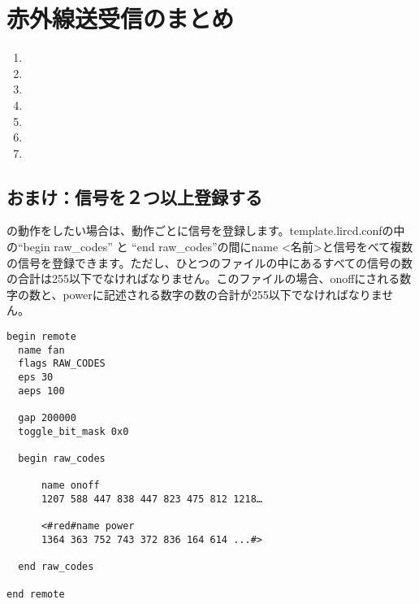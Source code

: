 \newpage
\section{赤外線送受信のまとめ}
\begin{enumerate}
\item {}
\item {}
\item {}
\item {}
\item {}
\item {}
\item {}
\end{enumerate}

\begin{tcolorbox}[title=\useOmetoi]
\begin{enumerate}
\end{enumerate}
\end{tcolorbox}



\subsection{おまけ：信号を２つ以上登録する}
の動作をしたい場合は、動作ごとに信号を登録します。template.lircd.confの中の“begin raw\_codes” と “end raw\_codes”の間にname <名前>と信号をべて複数の信号を登録できます。ただし、ひとつのファイルの中にあるすべての信号の数の合計は255以下でなければなりません。このファイルの場合、onoffにされる数字の数と、powerに記述される数字の数の合計が255以下でなければなりません。\\

\begin{lstlisting}[caption=２つの信号を登録するときのtemplate.lircd.comf,label=２つの信号を登録するときのtemplate.lircd.comf]
begin remote
  name fan
  flags RAW_CODES
  eps 30
  aeps 100

  gap 200000
  toggle_bit_mask 0x0

  begin raw_codes

      name onoff
      1207 588 447 838 447 823 475 812 1218…

      <#red#name power
      1364 363 752 743 372 836 164 614 ...#>

  end raw_codes

end remote
\end{lstlisting}

